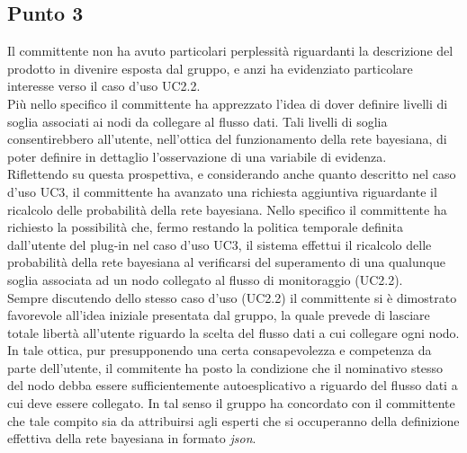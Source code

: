 \subsection{Punto 3}
Il committente non ha avuto particolari perplessità riguardanti la descrizione del prodotto in divenire esposta dal gruppo, e anzi ha evidenziato particolare interesse verso il caso d'uso UC2.2.\\
Più nello specifico il committente ha apprezzato l'idea di dover definire livelli di soglia associati ai nodi da collegare al flusso dati. Tali livelli di soglia consentirebbero all'utente, nell'ottica del funzionamento della rete bayesiana, di poter definire in dettaglio l'osservazione di una variabile di evidenza.\\
Riflettendo su questa prospettiva, e considerando anche quanto descritto nel caso d'uso UC3, il committente ha avanzato una richiesta aggiuntiva riguardante il ricalcolo delle probabilità della rete bayesiana.
Nello specifico il committente ha richiesto la possibilità che, fermo restando la politica temporale definita dall'utente del plug-in nel caso d'uso UC3, il sistema effettui il ricalcolo delle probabilità della rete bayesiana al verificarsi del superamento di una qualunque soglia associata ad un nodo collegato al flusso di monitoraggio (UC2.2).\\
Sempre discutendo dello stesso caso d'uso (UC2.2) il committente si è dimostrato favorevole all'idea iniziale presentata dal gruppo, la quale prevede di lasciare totale libertà all'utente riguardo la scelta del flusso dati  a cui collegare ogni nodo. In tale ottica, pur presupponendo una certa consapevolezza e competenza da parte dell'utente, il commitente ha posto la condizione che il nominativo stesso del nodo debba essere sufficientemente autoesplicativo a riguardo del flusso dati a cui deve essere collegato. In tal senso il gruppo ha concordato con il committente che tale compito sia da attribuirsi agli esperti che si occuperanno della definizione effettiva della rete bayesiana in formato \textit{json}\glossario.